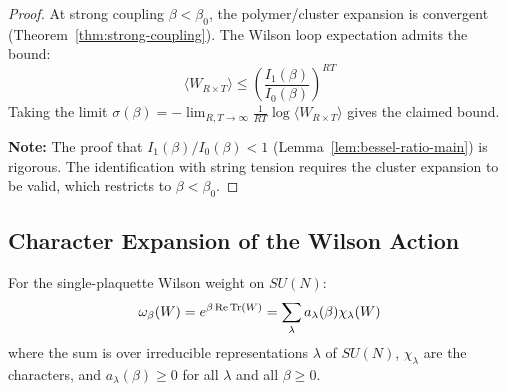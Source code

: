 \begin{proof}
At strong coupling $\beta < \beta_0$, the polymer/cluster expansion is convergent 
(Theorem~\ref{thm:strong-coupling}). The Wilson loop expectation admits the bound:
\[
\langle W_{R \times T} \rangle \leq \left(\frac{I_1(\beta)}{I_0(\beta)}\right)^{RT}
\]
Taking the limit $\sigma(\beta) = -\lim_{R,T \to \infty} \frac{1}{RT} \log \langle W_{R \times T} \rangle$ 
gives the claimed bound.

\textbf{Note:} The proof that $I_1(\beta)/I_0(\beta) < 1$ (Lemma~\ref{lem:bessel-ratio-main}) 
is rigorous. The identification with string tension requires the cluster expansion 
to be valid, which restricts to $\beta < \beta_0$.
\end{proof}

\subsection{Character Expansion of the Wilson Action}

\begin{lemma}
\label{lem:character-expansion-string}
For the single-plaquette Wilson weight on $SU(N)$:
\[
\omega_\beta(W) = e^{\beta \operatorname{Re}\operatorname{Tr}(W)} = \sum_\lambda a_\lambda(\beta) \chi_\lambda(W)
\]
where the sum is over irreducible representations $\lambda$ of $SU(N)$, 
$\chi_\lambda$ are the characters, and $a_\lambda(\beta) \geq 0$ for all 
$\lambda$ and all $\beta \geq 0$.
\end{lemma}

